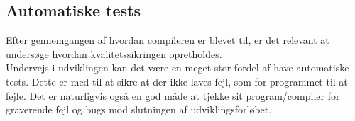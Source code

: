 \subsection{Automatiske tests}
Efter gennemgangen af hvordan compileren er blevet til, er det relevant at undersøge hvordan kvalitetssikringen opretholdes. \\

\noindent Undervejs i udviklingen kan det være en meget stor fordel af have automatiske tests. Dette er med til at sikre at der ikke laves fejl, som for programmet til at fejle. Det er naturligvis også en god måde at tjekke sit program/compiler for graverende fejl og bugs mod slutningen af udviklingsforløbet.